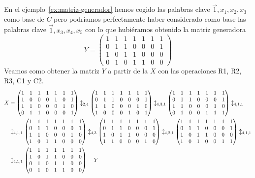 \begin{example}
	En el ejemplo~\eqref{ex:matriz-generador} hemos cogido las palabras clave $\vec{1}, x_1, x_2, x_3$ como base de $C$ pero podríamos perfectamente haber considerado como base las palabras clave $\vec{1}, x_3, x_4, x_5$ con lo que hubiéramos obtenido la matriz generadora
	\[
		Y=\begin{pmatrix*}
			  1&1&1&1&1&1&1\\
			  0&1&1&0&0&0&1\\
			  1&0&1&1&0&0&0\\
			  0&1&0&1&1&0&0
		\end{pmatrix*}
	\]
	Veamos como obtener la matriz $Y$ a partir de la $X$ con las operaciones R1, R2, R3, C1 y C2.
	\begin{align*}
		X&=\begin{pmatrix*}
			   1&1&1&1&1&1&1\\
			   1&0&0&0&1&0&1\\
			   1&1&0&0&0&1&0\\
			   0&1&1&0&0&0&1
		\end{pmatrix*}\Rr{2}{4}
		\begin{pmatrix*}
			1&1&1&1&1&1&1\\
			0&1&1&0&0&0&1\\
			1&1&0&0&0&1&0\\
			1&0&0&0&1&0&1
		\end{pmatrix*}\Rrrr{4}{3}{1}
		\begin{pmatrix*}
			1&1&1&1&1&1&1\\
			0&1&1&0&0&0&1\\
			1&1&0&0&0&1&0\\
			0&1&0&0&1&1&1
		\end{pmatrix*}\Rrrr{4}{1}{1}\\
		&\Rrrr{4}{1}{1}
		\begin{pmatrix*}
			1&1&1&1&1&1&1\\
			0&1&1&0&0&0&1\\
			1&1&0&0&0&1&0\\
			1&0&1&1&0&0&0
		\end{pmatrix*}\Rr{4}{3}
		\begin{pmatrix*}
			1&1&1&1&1&1&1\\
			0&1&1&0&0&0&1\\
			1&0&1&1&0&0&0\\
			1&1&0&0&0&1&0
		\end{pmatrix*}\Rrrr{4}{2}{1}
		\begin{pmatrix*}
			1&1&1&1&1&1&1\\
			0&1&1&0&0&0&1\\
			1&0&1&1&0&0&0\\
			1&0&1&0&0&1&1
		\end{pmatrix*}\Rrrr{4}{1}{1}\\
		&\Rrrr{4}{1}{1}
		\begin{pmatrix*}
			  1&1&1&1&1&1&1\\
			  1&0&1&1&0&0&0\\
			  0&1&0&1&1&0&0\\
			  0&1&0&1&1&0&0
		\end{pmatrix*}=Y
	\end{align*}

\end{example}
